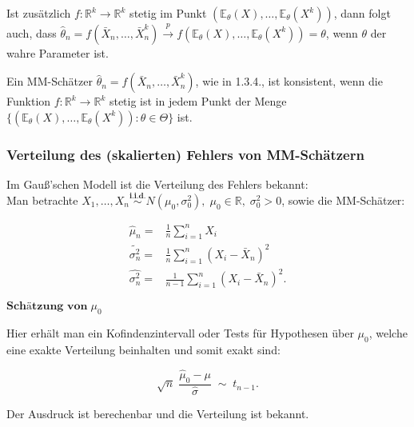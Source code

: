 \documentclass[10pt]{article}
\newcommand{\FZV}{X_1, \ldots, X_n} %
\newcommand{\IR}{\mathbb{R}} %
\newcommand{\EW}{\mathbb{E}} %
\begin{document}
\begin{enumerate}
	Ist zusätzlich $f: \IR^k \rightarrow \IR^k$ stetig im Punkt $(\EW_\theta(X),\ldots,\EW_\theta(X^k))$, dann folgt auch, dass $\hat{\theta}_n = f(\bar{X}_n, \ldots, \bar{X}^k_n) \overset{p} \rightarrow f(\EW_\theta(X),\ldots,\EW_\theta(X^k)) = \theta$, wenn $\theta$ der wahre Parameter ist. 

	\begin{Definition}
	Ein MM-Schätzer $\hat\theta_n = f(\bar{X}_n,\ldots,\bar{X}^k_n)$, wie in 1.3.4., ist konsistent, wenn die Funktion $f:\IR ^k \rightarrow \IR ^k$ stetig ist in jedem Punkt der Menge $\{(\EW_\theta(X),\ldots, \EW_\theta(X^k)) : \theta \in \Theta\}$ ist.	\end{Definition}

\end{enumerate}

\subsubsection{Verteilung des (skalierten) Fehlers von MM-Schätzern}

	Im Gauß'schen Modell ist die Verteilung des Fehlers bekannt: \\
	Man  betrachte $\FZV \overset{\textbf{i.i.d.}} {\sim} N(\mu_0,\sigma_0^2),\; \mu_0 \in \IR, \; \sigma_0^2 >0$, sowie die MM-Schätzer:
	
	\begin{equation*}
	\begin{split}
		\hat{\mu}_n =& \frac{1}{n}\sum_{i=1}^{n} X_i\\
		\tilde{\sigma^2_n} =&\frac{1}{n}\sum_{i=1}^{n} (X_i - \bar{X}_n)^2\\
		\hat{\sigma^2_n}=&\frac{1}{n-1}\sum_{i=1}^{n} (X_i - \bar{X}_n)^2.
	\end{split}
	\end{equation*}
	
		\noindent $\textbf{Schätzung von} \; \mu_0$
	
		\noindent Hier  erhält man ein Kofindenzintervall oder Tests für Hypothesen über $\mu_0$, welche eine exakte Verteilung beinhalten und somit exakt sind:
	
	\begin{equation*}
		\sqrt{n} \; \frac{\hat{\mu}_0 - \mu}{\hat{\sigma}} \;{\sim}\; t_{n-1}.
	\end{equation*}
	
		\noindent Der Ausdruck ist berechenbar und die Verteilung ist bekannt.\\
\end{document}
